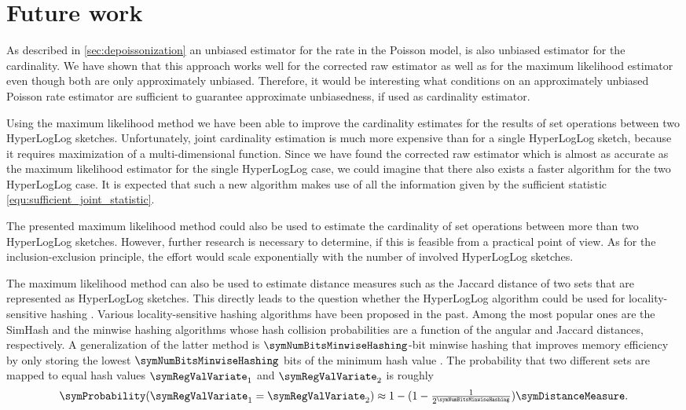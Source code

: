 \documentclass[a4paper]{scrartcl}
\begin{document}
\section{Future work}
As described in \cref{sec:depoissonization} an unbiased estimator for the rate in the Poisson model, is also unbiased estimator for the cardinality. We have shown that this approach works well for the corrected raw estimator as well as for the maximum likelihood estimator even though both are only approximately unbiased. Therefore, it would be interesting what conditions on an approximately unbiased Poisson rate estimator are sufficient to guarantee approximate unbiasedness, if used as cardinality estimator.

Using the maximum likelihood method we have been able to improve the cardinality estimates for the results of set operations between two HyperLogLog sketches. Unfortunately, joint cardinality estimation is much more expensive than for a single HyperLogLog sketch, because it requires maximization of a multi-dimensional function. Since we have found the corrected raw estimator which is almost as accurate as the maximum likelihood estimator for the single HyperLogLog case, we could imagine that there also exists a faster algorithm for the two HyperLogLog case. It is expected that such a new algorithm makes use of all the information given by the sufficient statistic \eqref{equ:sufficient_joint_statistic}.

The presented maximum likelihood method could also be used to estimate the cardinality of set operations between more than two HyperLogLog sketches. However, further research is necessary to determine, if this is feasible from a practical point of view. As for the inclusion-exclusion principle, the effort would scale exponentially with the number of involved HyperLogLog sketches.

The maximum likelihood method can also be used to estimate distance measures such as the Jaccard distance of two sets that are represented as HyperLogLog sketches. This directly leads to the question whether the HyperLogLog algorithm could be used for locality-sensitive hashing \cite{Leskovec2014, Wang2014}. Various locality-sensitive hashing algorithms have been proposed in the past. Among the most popular ones are the SimHash \cite{Charikar2002} and the minwise hashing \cite{Broder1997} algorithms whose hash collision probabilities are a function of the angular and Jaccard distances, respectively. A generalization of the latter method is $\symNumBitsMinwiseHashing$-bit minwise hashing that improves memory efficiency by only storing the lowest $\symNumBitsMinwiseHashing$ bits of the minimum hash value \cite{Li2011}. The probability that two different sets are mapped to equal hash values $\symRegValVariate_1$ and $\symRegValVariate_2$ is roughly 
\begin{equation}
\label{equ:minwise_hahsing_probability}
\symProbability(\symRegValVariate_1=\symRegValVariate_2)
\approx
1-
(1-\textstyle\frac{1}{2 ^\symNumBitsMinwiseHashing})\symDistanceMeasure.
\end{equation}
\end{document}
